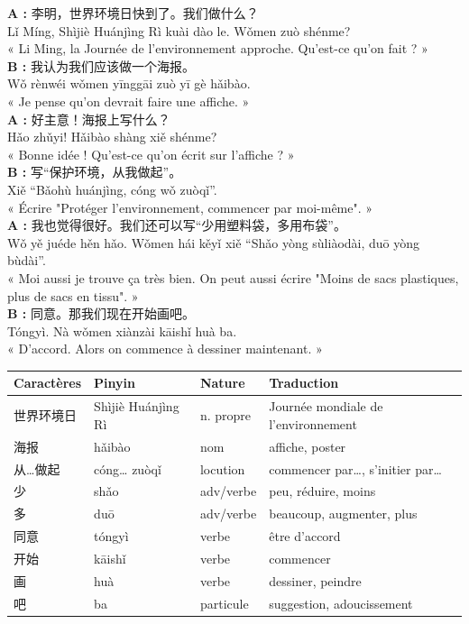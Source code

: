 \documentclass[11pt]{article}
\begin{document}
\begin{textebox}
\textbf{A :} 李明，世界环境日快到了。我们做什么？\\
Lǐ Míng, Shìjiè Huánjìng Rì kuài dào le. Wǒmen zuò shénme?\\
« Li Ming, la Journée de l'environnement approche. Qu'est-ce qu'on fait ? »\\[4pt]
\textbf{B :} 我认为我们应该做一个海报。\\
Wǒ rènwéi wǒmen yīnggāi zuò yī gè hǎibào.\\
« Je pense qu'on devrait faire une affiche. »\\[4pt]
\textbf{A :} 好主意！海报上写什么？\\
Hǎo zhǔyi! Hǎibào shàng xiě shénme?\\
« Bonne idée ! Qu'est-ce qu'on écrit sur l'affiche ? »\\[4pt]
\textbf{B :} 写“保护环境，从我做起”。\\
Xiě “Bǎohù huánjìng, cóng wǒ zuòqǐ”.\\
« Écrire "Protéger l'environnement, commencer par moi-même". »\\[4pt]
\textbf{A :} 我也觉得很好。我们还可以写“少用塑料袋，多用布袋”。\\
Wǒ yě juéde hěn hǎo. Wǒmen hái kěyǐ xiě “Shǎo yòng sùliàodài, duō yòng bùdài”.\\
« Moi aussi je trouve ça très bien. On peut aussi écrire "Moins de sacs plastiques, plus de sacs en tissu". »\\[4pt]
\textbf{B :} 同意。那我们现在开始画吧。\\
Tóngyì. Nà wǒmen xiànzài kāishǐ huà ba.\\
« D'accord. Alors on commence à dessiner maintenant. »
\end{textebox}

\begin{center}
\begin{tabularx}{\linewidth}{|X|X|X|X|}
\hline
\rowcolor{popblueL} \textbf{Caractères} & \textbf{Pinyin} & \textbf{Nature} & \textbf{Traduction} \\
\hline
世界环境日 & Shìjiè Huánjìng Rì & n. propre & Journée mondiale de l'environnement \\
\hline
海报 & hǎibào & nom & affiche, poster \\
\hline
从…做起 & cóng… zuòqǐ & locution & commencer par…, s'initier par… \\
\hline
少 & shǎo & adv/verbe & peu, réduire, moins \\
\hline
多 & duō & adv/verbe & beaucoup, augmenter, plus \\
\hline
同意 & tóngyì & verbe & être d'accord \\
\hline
开始 & kāishǐ & verbe & commencer \\
\hline
画 & huà & verbe & dessiner, peindre \\
\hline
吧 & ba & particule & suggestion, adoucissement \\
\hline
\end{tabularx}
\end{center}
\end{document}
